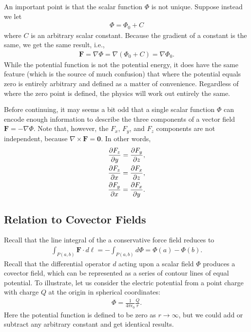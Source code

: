 An important point is that the scalar function $\Phi$ is not unique. Suppose instead we let
\begin{align}
  \Phi = \Phi_0 + C
\end{align}
where $C$ is an arbitrary scalar constant. Because the gradient of a constant is the same, we get the same result, i.e.,
\begin{align}
  \mathbf{F} = \nabla \Phi = \nabla ( \Phi_0 + C ) = \nabla \Phi_0 .
\end{align}
While the potential function is not the potential energy, it does have the same feature (which is the source of much confusion) that where the potential equals zero is entirely arbitrary and defined as a matter of convenience. Regardless of where the zero point is defined, the physics will work out entirely the same.

Before continuing, it may seems a bit odd that a single scalar function $\Phi$ can encode enough information to describe the three components of a vector field $\mathbf{F} = -\nabla \Phi$. Note that, however, the $F_x$, $F_y$, and $F_z$ components are not independent, because $\nabla \times \mathbf{F} = \mathbf{0}$. In other words,
\begin{align}
  \frac{ \partial {F_z} }{ \partial {y} } = \frac{ \partial {F_y} }{ \partial {z} }, \nonumber \\
  \frac{ \partial {F_z} }{ \partial {x} } = \frac{ \partial {F_x} }{ \partial {z} }, \nonumber \\
  \frac{ \partial {F_y} }{ \partial {x} } = \frac{ \partial {F_x} }{ \partial {y} }. \nonumber
\end{align}


\subsection{Relation to Covector Fields}

Recall that the line integral of the a conservative force field reduces to 
\begin{align}
  \int_{P(a,b)} \mathbf{F} \cdot d\boldsymbol\ell = - \int_{P(a,b)} d \Phi = \Phi(a) - \Phi(b) .
\end{align}
Recall that the differential operator $d$ acting upon a scalar field $\Phi$ produces a covector field, which can be represented as a series of contour lines of equal potential. To illustrate, let us consider the electric potential from a point charge with charge $Q$ at the origin in spherical coordinates:
\begin{align}
  \Phi = \frac{1}{4\pi\epsilon_0} \frac{Q}{r} .
\end{align}
Here the potential function is defined to be zero as $r \rightarrow \infty$, but we could add or subtract any arbitrary constant and get identical results. 

